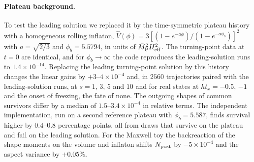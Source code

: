 \paragraph{Plateau background.}
To test the leading solution we replaced it by the time-symmetric plateau history with a homogeneous rolling inflaton, $\hat V(\phi)=3[(1-e^{-a\phi})/(1-e^{-a\phi_b})]^2$ with $a=\sqrt{2/3}$ and $\phi_b=5.5794$, in units of $\bar M_{\mathrm{P}}^2H_{\mathrm{eff}}^2$. %
The turning-point data at $t=0$ are identical, and for $\phi_b\to\infty$ the code reproduces the leading-solution runs to $1.4\times10^{-14}$. %
Replacing the leading turning-point solution by this history changes the linear gains by $+3$--$4\times10^{-4}$ and, in $2560$ trajectories paired with the leading-solution runs, at $s=1$, $3$, $5$ and $10$ and for real states at $ht_x=-0.5$, $-1$ and the onset of freezing, the fate of none. %
The outgoing shapes of common survivors differ by a median of $1.5$--$3.4\times10^{-4}$ in relative terms. %
The independent implementation, run on a second reference plateau with $\phi_b=5.587$, finds survival higher by $0.4$--$0.8$ percentage points, all from draws that survive on the plateau and fail on the leading solution. %
For the Maxwell toy the backreaction of the shape moments on the volume and inflaton shifts $N_{\rm post}$ by $-5\times10^{-4}$ and the aspect variance by $+0.05\%$. %

